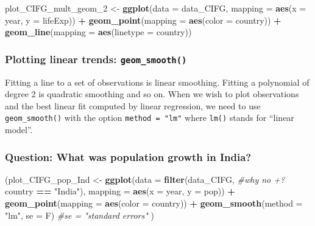 \documentclass[12pt,]{article}
\newenvironment{Shaded}{\begin{snugshade}}{\end{snugshade}}
\newcommand{\KeywordTok}[1]{\textcolor[rgb]{0.13,0.29,0.53}{\textbf{#1}}}
\newcommand{\DataTypeTok}[1]{\textcolor[rgb]{0.13,0.29,0.53}{#1}}
\newcommand{\DecValTok}[1]{\textcolor[rgb]{0.00,0.00,0.81}{#1}}
\newcommand{\StringTok}[1]{\textcolor[rgb]{0.31,0.60,0.02}{#1}}
\newcommand{\CommentTok}[1]{\textcolor[rgb]{0.56,0.35,0.01}{\textit{#1}}}
\newcommand{\OperatorTok}[1]{\textcolor[rgb]{0.81,0.36,0.00}{\textbf{#1}}}
\newcommand{\NormalTok}[1]{#1}
\begin{document}
\begin{Shaded}
\begin{Highlighting}[]
\NormalTok{plot_CIFG_mult_geom_}\DecValTok{2}\NormalTok{ <-}\StringTok{ }\KeywordTok{ggplot}\NormalTok{(}\DataTypeTok{data =}\NormalTok{ data_CIFG, }
                                \DataTypeTok{mapping =} \KeywordTok{aes}\NormalTok{(}\DataTypeTok{x =}\NormalTok{ year, }
                                              \DataTypeTok{y =}\NormalTok{ lifeExp)) }\OperatorTok{+}
\StringTok{  }\KeywordTok{geom_point}\NormalTok{(}\DataTypeTok{mapping =}  \KeywordTok{aes}\NormalTok{(}\DataTypeTok{color =}\NormalTok{ country)) }\OperatorTok{+}
\StringTok{  }\KeywordTok{geom_line}\NormalTok{(}\DataTypeTok{mapping =} \KeywordTok{aes}\NormalTok{(}\DataTypeTok{linetype =}\NormalTok{ country))}
\end{Highlighting}
\end{Shaded}

\subsubsection{\texorpdfstring{Plotting linear trends:
\texttt{geom\_smooth()}}{Plotting linear trends: geom\_smooth()}}\label{plotting-linear-trends-geom_smooth}

Fitting a line to a set of observations is linear smoothing. Fitting a
polynomial of degree 2 is quadratic smoothing and so on. When we wish to
plot observations and the best linear fit computed by linear regression,
we need to use \texttt{geom\_smooth()} with the option
\texttt{method\ =\ "lm"} where \texttt{lm()} stands for ``linear
model''.

\subsubsection{Question: What was population growth in
India?}\label{question-what-was-population-growth-in-india}

\begin{Shaded}
\begin{Highlighting}[]
\NormalTok{(plot_CIFG_pop_Ind <-}\StringTok{ }\KeywordTok{ggplot}\NormalTok{(}\DataTypeTok{data =} \KeywordTok{filter}\NormalTok{(data_CIFG, }\CommentTok{#why no +?}
\NormalTok{                                           country }\OperatorTok{==}\StringTok{ "India"}\NormalTok{), }
                         \DataTypeTok{mapping =} \KeywordTok{aes}\NormalTok{(}\DataTypeTok{x =}\NormalTok{ year, }\DataTypeTok{y =}\NormalTok{ pop)) }\OperatorTok{+}
\StringTok{  }\KeywordTok{geom_point}\NormalTok{(}\DataTypeTok{mapping =} \KeywordTok{aes}\NormalTok{(}\DataTypeTok{color =}\NormalTok{ country)) }\OperatorTok{+}
\StringTok{  }\KeywordTok{geom_smooth}\NormalTok{(}\DataTypeTok{method =} \StringTok{"lm"}\NormalTok{, }\DataTypeTok{se =}\NormalTok{ F) }\CommentTok{#se = "standard errors"}
\NormalTok{ )}
\end{Highlighting}
\end{Shaded}
\end{document}
